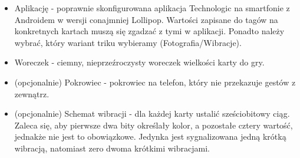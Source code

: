 \documentclass{article}
\numberwithin{equation}{section}
\begin{document}
\begin{itemize}
    \item Aplikację - poprawnie skonfigurowana aplikacja Technologic na smartfonie z Androidem w wersji conajmniej Lollipop. Wartości zapisane do tagów na konkretnych kartach muszą się zgadzać z tymi w aplikacji. Ponadto należy wybrać, który wariant triku wybieramy (Fotografia/Wibracje).
    \item Woreczek - ciemny, nieprzeźroczysty woreczek wielkości karty do gry.
    \item (opcjonalnie) Pokrowiec - pokrowiec na telefon, który nie przekazuje gestów z zewnątrz.
    \item (opcjonalnie) Schemat wibracji - dla każdej karty ustalić sześciobitowy ciąg. Zaleca się, aby pierwsze dwa bity określały kolor, a pozostałe cztery wartość, jednakże nie jest to obowiązkowe. Jedynka jest sygnalizowana jedną krótką wibracją, natomiast zero dwoma krótkimi wibracjami.
\end{itemize}
\end{document}

